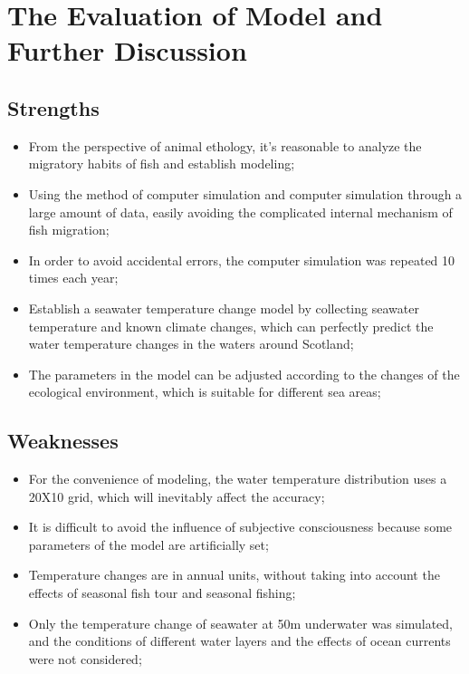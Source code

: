 \documentclass{mcmthesis}
\numberwithin{figure}{section}
\numberwithin{table}{section}
\begin{document}
\section{The Evaluation of Model and Further Discussion}

\subsection{Strengths}

\begin{itemize}
  \item From the perspective of animal ethology, it's reasonable to analyze the migratory habits of fish and establish modeling;
  \item Using the method of computer simulation and computer simulation through a large amount of data, easily avoiding the complicated internal mechanism of fish migration;
  \item In order to avoid accidental errors, the computer simulation was repeated 10 times each year;
  \item Establish a seawater temperature change model by collecting seawater temperature and known climate changes, which can perfectly predict the water temperature changes in the waters around Scotland;
  \item The parameters in the model can be adjusted according to the changes of the ecological environment, which is suitable for different sea areas;
\end{itemize}

\subsection{Weaknesses}
\begin{itemize}
  \item For the convenience of modeling, the water temperature distribution uses a 20X10 grid, which will inevitably affect the accuracy;
  \item It is difficult to avoid the influence of subjective consciousness because some parameters of the model are artificially set;
  \item Temperature changes are in annual units, without taking into account the effects of seasonal fish tour and seasonal fishing;
  \item Only the temperature change of seawater at 50m underwater was simulated, and the conditions of different water layers and the effects of ocean currents were not considered;
\end{itemize}
\end{document}
